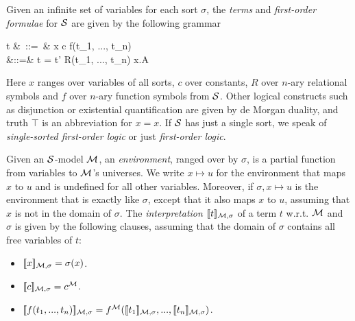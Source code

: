 Given an infinite set of variables for each sort $\sigma$, the
\emph{terms} and \emph{first-order formulae} for $\mathcal{S}$ are given by
the following grammar
\begin{GRAMMAR}
  t &\ ::=\ & x \VERTICAL c \VERTICAL f(t_1, ..., t_n) \\[1mm]
  \phi &::=& t = t' \VERTICAL R(t_1, ..., t_n) \VERTICAL \neg \phi \VERTICAL \phi \AND \psi \VERTICAL \forall x.A
\end{GRAMMAR}

\NI Here $x$ ranges over variables of all sorts, $c$ over constants,
$R$ over $n$-ary relational symbols and $f$ over $n$-ary function
symbols from $\mathcal{S}$.  Other logical constructs such as disjunction or
existential quantification are given by de Morgan duality, and truth
$\top$ is an abbreviation for $x = x$. If $\mathcal{S}$ has just a single
sort, we speak of \emph{single-sorted first-order logic} or just
\emph{first-order logic}. 

Given an $\mathcal{S}$-model $\mathcal{M}$, an \emph{environment}, ranged over by
$\sigma$, is a partial function from variables to $\mathcal{M}$'s
universes.  We write $x \mapsto u$ for the environment that maps $x$ to
$u$ and is undefined for all other variables. Moreover, if $\sigma, x
\mapsto u$ is the environment that is exactly like $\sigma$, except
that it also maps $x$ to $u$, assuming that $x$ is not in the domain
of $\sigma$.  The \emph{interpretation} $\lbrack\!\lbrack t \rbrack\!\rbrack_{\mathcal{M}, \sigma}$
of a term $t$ w.r.t. $\mathcal{M}$ and $\sigma$ is given by the following
clauses, assuming that the domain of $\sigma$ contains all free
variables of $t$:
\begin{itemize}

\item $\lbrack\!\lbrack x \rbrack\!\rbrack_{\mathcal{M}, \sigma} = \sigma(x)$.
\item $\lbrack\!\lbrack c \rbrack\!\rbrack_{\mathcal{M}, \sigma} = c^{\mathcal{M}}$.
\item $\lbrack\!\lbrack f(t_1, ..., t_n) \rbrack\!\rbrack_{\mathcal{M}, \sigma} =
  f^{\mathcal{M}}(\lbrack\!\lbrack t_1 \rbrack\!\rbrack_{\mathcal{M}, \sigma}, ..., \lbrack\!\lbrack t_n \rbrack\!\rbrack_{\mathcal{M},
    \sigma})$.

\end{itemize}


